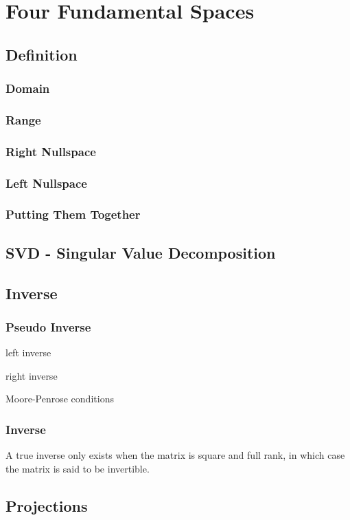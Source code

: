 \chapter{Four Fundamental Spaces}

\section{Definition}
\subsection{Domain}
\subsection{Range}
\subsection{Right Nullspace}
\subsection{Left Nullspace}
\subsection{Putting Them Together}

\section{SVD - Singular Value Decomposition}


\section{Inverse}

\subsection{Pseudo Inverse}
left inverse

right inverse

Moore-Penrose conditions

\subsection{Inverse}
A true inverse only exists when the matrix is square and full rank, in which case the matrix is said to be invertible.

\section{Projections}
